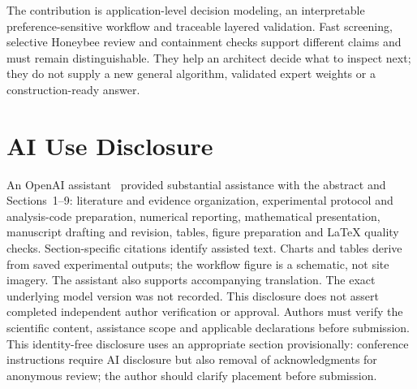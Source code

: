 \documentclass{llncs}
\begin{document}
The contribution is application-level decision modeling, an interpretable preference-sensitive workflow and traceable layered validation. Fast screening, selective Honeybee review and containment checks support different claims and must remain distinguishable. They help an architect decide what to inspect next; they do not supply a new general algorithm, validated expert weights or a construction-ready answer.

\section*{AI Use Disclosure}
An OpenAI assistant~\cite{openai2026} provided substantial assistance with the abstract and Sections~1--9: literature and evidence organization, experimental protocol and analysis-code preparation, numerical reporting, mathematical presentation, manuscript drafting and revision, tables, figure preparation and LaTeX quality checks. Section-specific citations identify assisted text. Charts and tables derive from saved experimental outputs; the workflow figure is a schematic, not site imagery. The assistant also supports accompanying translation. The exact underlying model version was not recorded. This disclosure does not assert completed independent author verification or approval. Authors must verify the scientific content, assistance scope and applicable declarations before submission. This identity-free disclosure uses an appropriate section provisionally: conference instructions require AI disclosure but also removal of acknowledgments for anonymous review; the author should clarify placement before submission.
\FloatBarrier

\end{document}
